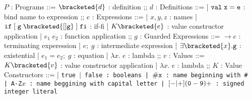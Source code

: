 \documentclass[]{article}
\begin{document}
\begin{center}
    \begin{bnf}
    $P$ : \textsf{Programs} ::=
    $\bracketed{d}$ : definition
    ;;
    $d$ : \textsf{Definitions} ::=
    | $\tt{val} \; x \; \tt{=} \; e$ : bind name to expression
    ;;
    $e$ : \textsf{Expressions} ::=
    | $x, y, z$ : names
    | $\tt{if} \; \tt{[}\; g \; \bracketed{[] g} \;\tt{]} \; \tt{fi}$ : if-fi 
    | $K \bracketed{e}$ : value constructor application 
    | $e_{1} \; e_{2}$ : function application 
    ;;
    $g$ : \textsf{Guarded Expressions} ::=  
    $\boldsymbol{\rightarrow}e$ : terminating experession
    | $e; \; g$ : intermediate expression 
    | $\exists \bracketed{x} \tt{.} g$ : existential 
    | $e_{1} = e_{2}; \; g$ : equation 
    | $\lambda x. \; e$ : lambda 
    ;;
    $v$ : Values ::= $K\bracketed{v}$ : value constructor application 
    | $\lambda x. \; e$ : lambda 
    ;;
    $K$ : \textsf{Value Constructors} ::=
    | \tt{true} $\vert$ \tt{false} : booleans
    | $\tt{\#}x$ : name beginning with \tt{\#}
    | \tt{A-Z}$x$ : name beggining with capital letter
    | $[\tt{-}\vert\tt{+}](\tt{0}-\tt{9})+$ : signed integer literal 
    \end{bnf}
\end{center}

\end{document}
